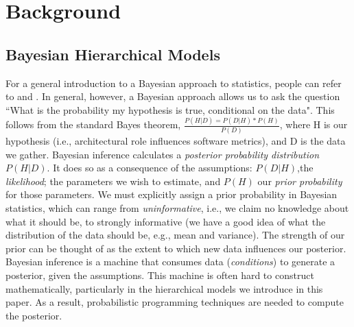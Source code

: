 \documentclass[sigconf,natbib=false]{acmart}
\begin{document}
\section{Background}
\subsection{Bayesian Hierarchical Models} %
For a general introduction to a Bayesian approach to statistics, people can refer to \cite{gelman14} and \cite{mcilreath16}. In general, however, a Bayesian approach allows us to ask the question ``What is the probability my hypothesis is true, conditional on the data". This follows from the standard Bayes theorem, $\frac{P(H | D) = P(D | H) * P(H)}{P(D)}$, where H is our hypothesis (i.e., architectural role influences software metrics), and D is the data we gather. Bayesian inference calculates a \emph{posterior probability distribution} $P(H|D)$. It does so as a consequence of the assumptions: $P(D | H)$,the \emph{likelihood}; the parameters we wish to estimate, and $P(H)$ our \emph{prior probability} for those parameters. We must explicitly assign a prior probability in Bayesian statistics, which can range from \emph{uninformative}, i.e., we claim no knowledge about what it should be, to strongly informative (we have a good idea of what the distribution of the data should be, e.g., mean and variance). The strength of our prior can be thought of as the extent to which new data influences our posterior. Bayesian inference is a machine that consumes data (\emph{conditions}) to generate a posterior, given the assumptions. This machine is often hard to construct mathematically, particularly in the hierarchical models we introduce in this paper. As a result, probabilistic programming techniques are needed to compute the posterior. 

\end{document}
